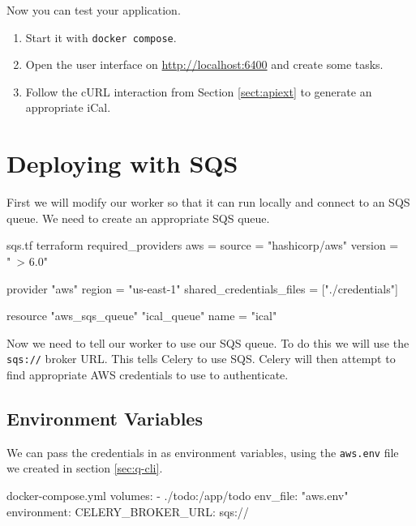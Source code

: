\documentclass{csse4400}
\begin{document}
\noindent
Now you can test your application.
\vspace{-.2em}
\begin{enumerate}
    \item Start it with \texttt{docker compose}.
          \vspace{-1em}
    \newpage
    \item Open the user interface on \url{http://localhost:6400} and create some tasks.
    \item Follow the cURL interaction from Section \ref{sect:apiext} to generate an appropriate iCal.
\end{enumerate}


\section{Deploying with SQS}

First we will modify our worker so that it can run locally and connect to an SQS queue.
We need to create an appropriate SQS queue.
%
\begin{code}[language=terraform,numbers=none]{sqs.tf}
terraform {
  required_providers {
    aws = {
      source = "hashicorp/aws"
      version = "~> 6.0"
    }
  }
}

provider "aws" {
  region = "us-east-1"
  shared_credentials_files = ["./credentials"]
}

resource "aws_sqs_queue" "ical_queue" {
    name = "ical"
}\end{code}


Now we need to tell our worker to use our SQS queue.
To do this we will use the \texttt{sqs://} broker URL.
This tells Celery to use SQS.
Celery will then attempt to find appropriate AWS credentials to use to authenticate.

\subsection{Environment Variables}

We can pass the credentials in as environment variables,
using the \texttt{aws.env} file we created in section \ref{sec:q-cli}.

\vspace{-1.25em}
\begin{code}[numbers=none]{docker-compose.yml}
    volumes:
      - ./todo:/app/todo
    env_file: "aws.env"
    environment:
      CELERY_BROKER_URL: sqs://
\end{code}
\end{document}
